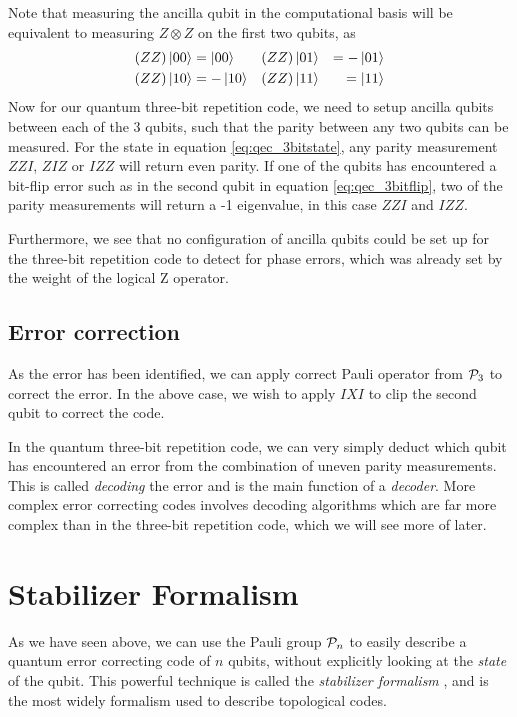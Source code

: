 Note that measuring the ancilla qubit in the computational basis will be equivalent to measuring $Z\otimes Z$ on the first two qubits, as
\begin{equation}
\begin{aligned}
    (ZZ)\ket{00} &= \ket{00} && (ZZ)\ket{01} &= -\ket{01} \\
    (ZZ)\ket{10} &= -\ket{10} && (ZZ)\ket{11} &= \ket{11}
\end{aligned}
\end{equation}
Now for our quantum three-bit repetition code, we need to setup ancilla qubits between each of the 3 qubits, such that the parity between any two qubits can be measured. For the state in equation \ref{eq:qec_3bitstate}, any parity measurement $ZZI$, $ZIZ$ or $IZZ$ will return even parity. If one of the qubits has encountered a bit-flip error such as in the second qubit in equation \ref{eq:qec_3bitflip}, two of the parity measurements will return a -1 eigenvalue, in this case $ZZI$ and $IZZ$.

Furthermore, we see that no configuration of ancilla qubits could be set up for the three-bit repetition code to detect for phase errors, which was already set by the weight of the logical Z operator.

\subsection{Error correction}

As the error has been identified, we can apply correct Pauli operator from $\mathcal{P}_3$ to correct the error. In the above case, we wish to apply $IXI$ to clip the second qubit to correct the code.

In the quantum three-bit repetition code, we can very simply deduct which qubit has encountered an error from the combination of uneven parity measurements. This is called \emph{decoding} the error and is the main function of a \emph{decoder}. More complex error correcting codes involves decoding algorithms which are far more complex than in the three-bit repetition code, which we will see more of later.


\section{Stabilizer Formalism}\label{sec:stabilizerformalism}

As we have seen above, we can use the Pauli group $\mathcal{P}_n$ to easily describe a quantum error correcting code of $n$ qubits, without explicitly looking at the \emph{state} of the qubit. This powerful technique is called the \emph{stabilizer formalism} \cite{gottesman1997stabilizer}, and is the most widely formalism used to describe topological codes.

